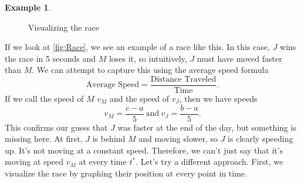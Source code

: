 \documentclass[12pt]{article}
\theoremstyle{definition}
\newtheorem{exmp}[thm]{Example}
\theoremstyle{plain}
\numberwithin{equation}{section}
\begin{document}
\begin{exmp}
\begin{figure}[h]
\begin{subfigure}{\textwidth}
  \centering
\end{subfigure}
\caption{Visualizing the race}
\end{figure}

If we look at \cref{fig:Race}, we see an example of a race like this. In this case, $J$ wins the race in 5 seconds and $M$ loses it, so intuitively, $J$ must have moved faster than $M$. We can attempt to capture this using the average speed formula
\begin{equation}
	\text{Average Speed}=\frac{\text{Distance Traveled}}{\text{Time}}.
\end{equation}
   If we call the speed of $M$ $v_M$ and the speed of $v_J$, then we  have speeds
\begin{equation}
v_M=\frac{c-a}{5}\ \text{and}\ v_J=\frac{b-a}{5}.
\end{equation}
This confirms our guess that $J$ was faster at the end of the day, but something is missing here. At first, $J$ is behind $M$ and moving slower, so $J$ is clearly speeding up. It's not moving at a constant speed. Therefore, we can't just say that it's moving at speed $v_M$ at every time $t^*$. Let's try a different approach. First, we visualize the race by graphing their position at every point in time.
\begin{figure}
  \hspace{-5mm}
\begin{subfigure}{0.35\textwidth}
  \centering
\end{subfigure}
\end{figure}
\end{exmp}
\end{document}
